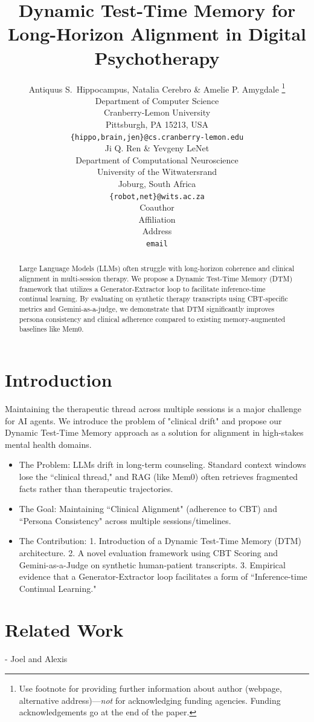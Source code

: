 \documentclass{article} %
\title{Dynamic Test-Time Memory for Long-Horizon Alignment in Digital Psychotherapy}
\author{Antiquus S.~Hippocampus, Natalia Cerebro \& Amelie P. Amygdale \thanks{ Use footnote for providing further information
about author (webpage, alternative address)---\emph{not} for acknowledging
funding agencies.  Funding acknowledgements go at the end of the paper.} \\
Department of Computer Science\\
Cranberry-Lemon University\\
Pittsburgh, PA 15213, USA \\
\texttt{\{hippo,brain,jen\}@cs.cranberry-lemon.edu} \\
\And
Ji Q. Ren \& Yevgeny LeNet \\
Department of Computational Neuroscience \\
University of the Witwatersrand \\
Joburg, South Africa \\
\texttt{\{robot,net\}@wits.ac.za} \\
\AND
Coauthor \\
Affiliation \\
Address \\
\texttt{email}
}
\begin{document}
\maketitle

\begin{abstract}
Large Language Models (LLMs) often struggle with long-horizon coherence and clinical alignment in multi-session therapy. We propose a Dynamic Test-Time Memory (DTM) framework that utilizes a Generator-Extractor loop to facilitate inference-time continual learning. By evaluating on synthetic therapy transcripts using CBT-specific metrics and Gemini-as-a-judge, we demonstrate that DTM significantly improves persona consistency and clinical adherence compared to existing memory-augmented baselines like Mem0.
\end{abstract}

\section{Introduction}

Maintaining the therapeutic thread across multiple sessions is a major challenge for AI agents. We introduce the problem of "clinical drift" and propose our Dynamic Test-Time Memory approach as a solution for alignment in high-stakes mental health domains.

\begin{itemize}
    \item The Problem: LLMs drift in long-term counseling. Standard context windows lose the ``clinical thread," and RAG (like Mem0) often retrieves fragmented facts rather than therapeutic trajectories.
    \item The Goal: Maintaining ``Clinical Alignment" (adherence to CBT) and ``Persona Consistency" across multiple sessions/timelines.
    \item The Contribution: 1. Introduction of a Dynamic Test-Time Memory (DTM) architecture.
    2. A novel evaluation framework using CBT Scoring and Gemini-as-a-Judge on synthetic human-patient transcripts.
    3. Empirical evidence that a Generator-Extractor loop facilitates a form of ``Inference-time Continual Learning."

\end{itemize}

\section{Related Work} - Joel and Alexis
\label{gen_inst}
\end{document}
